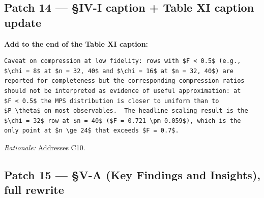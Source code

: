 \subsection*{Patch 14 --- \S IV-I caption + Table XI caption update}

\textbf{Add to the end of the Table XI caption:}

\begin{verbatim}
Caveat on compression at low fidelity: rows with $F < 0.5$ (e.g.,
$\chi = 8$ at $n = 32, 40$ and $\chi = 16$ at $n = 32, 40$) are
reported for completeness but the corresponding compression ratios
should not be interpreted as evidence of useful approximation: at
$F < 0.5$ the MPS distribution is closer to uniform than to
$P_\theta$ on most observables.  The headline scaling result is the
$\chi = 32$ row at $n = 40$ ($F = 0.721 \pm 0.059$), which is the
only point at $n \ge 24$ that exceeds $F = 0.7$.
\end{verbatim}

\noindent\emph{Rationale:} Addresses C10.

\subsection*{Patch 15 --- \S V-A (Key Findings and Insights), full rewrite}

